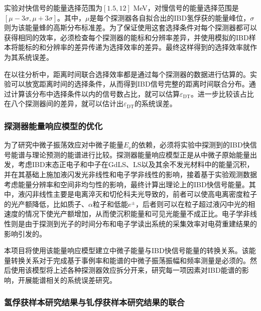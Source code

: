 \documentclass[a4paper,zihao=-4]{article}
\begin{document}
实验对快信号的能量选择范围为$[1.5, 12]$ MeV，对慢信号的能量选择范围是$[\mu-3\sigma, \mu+3\sigma]$。其中，$\mu$是每个探测器各自拟合出的IBD氢俘获的能量峰位，$\sigma$则为该能量蜂的高斯分布标准差。为了保证使用这套选择条件对每个探测器都可以获得相同的效率，必须检查每个探测器的能标和分辨率差异，并使用模拟的IBD样本将能标的和分辨率的差异传递为选择效率的差异。最终这样得到的选择效率就作为其系统误差。

在以往分析中，距离时间联合选择效率都是通过每个探测器的数据进行估算的。实验可以放宽距离时间的选择条件，从而得到IBD信号完整的距离时间联合分布。通过计算该分布中选择条件以内的信号数占比，就可以估算$\varepsilon_{\text{DT}}$。进一步比较该占比在八个探测器间的差异，就可以估计出$\varepsilon_{\text{DT}}$的系统误差。

\subsubsection{探测器能量响应模型的优化}\label{sec:energy-model}
为了研究中微子振荡效应对中微子能量$E_\nu$的依赖，必须将实验中探测到的IBD快信号能谱与理论预测的能谱进行比较。探测器能量响应模型正是从中微子原始能量出发，考虑IBD末态正电子和中子在GdLS、LS以及其余不发光材料中的能量沉积，并在其基础上施加液闪发光非线性和电子学非线性的影响，接着基于实验观测数据考虑能量分辨率和空间非均匀性的影响，最终计算出理论上的IBD快信号能量。其中，液闪非线性主要是电离淬灭和切伦科夫光导致的，前者可以使高电离密度粒子的光产额降低，比如质子、$\alpha$粒子和低能$e^\pm$，后者则可以在粒子超过液闪中光的相速度的情况下使光产额增加，从而使沉积能量和可见光能量不成正比。电子学非线性则是由于探测到光子的时间分布和电子学读出系统的采集效率对电荷重建结果的影响引发的。

本项目将使用该能量响应模型建立中微子能量与IBD快信号能量的转换关系。该能量转换关系对于完成基于事例率和能谱的中微子振荡振幅和频率测量是必须的。然后使用该模型将上述各种探测器效应拆分开来，研究每一项因素对IBD能谱的影响，开展能谱相关的系统误差研究。


\subsubsection{氢俘获样本研究结果与钆俘获样本研究结果的联合}\label{sec:nGdnH-combine}
\end{document}
